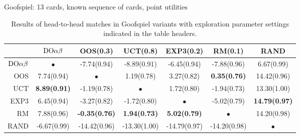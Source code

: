 \begin{table}
\begin{scriptsize}
Goofspiel: 13 cards, known sequence of cards, point utilities
\begin{tabular}{|r|cccccc|}\hline
&$\textrm{DO}\alpha\beta$&OOS(0.3)&UCT(0.8)&EXP3(0.2)&RM(0.1)&RAND\\\hline
$\textrm{DO}\alpha\beta$&$\bullet$&-7.74(0.94)&-8.89(0.91)&-6.45(0.94)&-7.88(0.96)&6.67(0.99)\\
OOS&7.74(0.94)&$\bullet$&1.19(0.78)&3.27(0.82)&\textbf{0.35(0.76)}&14.42(0.96)\\
UCT&\textbf{8.89(0.91)}&-1.19(0.78)&$\bullet$&1.72(0.80)&-1.94(0.73)&13.30(1.00)\\
EXP3&6.45(0.94)&-3.27(0.82)&-1.72(0.80)&$\bullet$&-5.02(0.79)&\textbf{14.79(0.97)}\\
RM&7.88(0.96)&\textbf{-0.35(0.76)}&\textbf{1.94(0.73)}&\textbf{5.02(0.79)}&$\bullet$&14.20(0.98)\\
RAND&-6.67(0.99)&-14.42(0.96)&-13.30(1.00)&-14.79(0.97)&-14.20(0.98)&$\bullet$\\
\hline
\end{tabular}
\end{scriptsize}
\caption{Results of head-to-head matches in Goofspiel variants with exploration parameter settings indicated in the table headers.}\label{fig:matches:goof}
\end{table}

